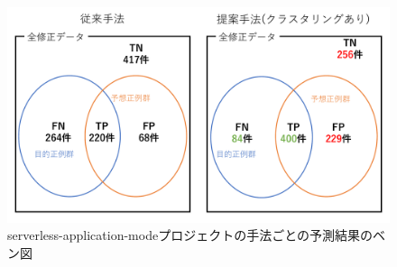\documentclass[11pt,dvipdfmx]{jreport}
\begin{document}

\begin{figure}[bp]
	\centering
	\includegraphics[width=1\linewidth]{Kameoka_fig/benzu-serverless-application-mode.pdf}
	\caption{serverless-application-modeプロジェクトの手法ごとの予測結果のベン図}
	\label{fig:serverless-application-mode}
\end{figure}

\end{document}
